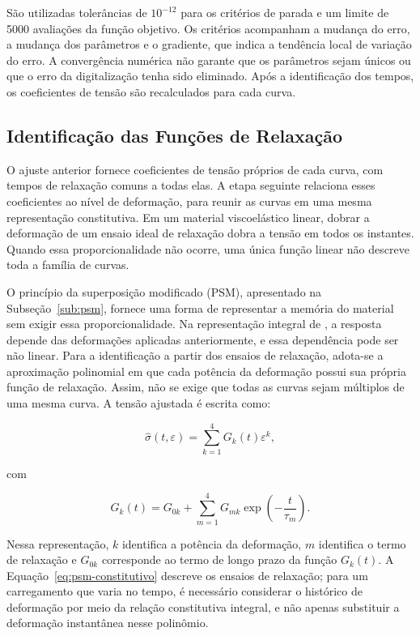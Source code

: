 \documentclass[arial,centeredequations,english,brazilian,oneside,section=TITLE]{ifes8}
\begin{document}
São utilizadas tolerâncias de $10^{-12}$ para os critérios de parada e um limite de
5000 avaliações da função objetivo. Os critérios acompanham a mudança do erro, a mudança
dos parâmetros e o gradiente, que indica a tendência local de variação do erro. A convergência
numérica não garante que os parâmetros sejam únicos ou que o erro da digitalização tenha
sido eliminado. Após a identificação dos tempos, os coeficientes de tensão são recalculados
para cada curva.

\subsection{Identificação das Funções de Relaxação}
\label{sec:identificacao-funcoes-relaxacao}

O ajuste anterior fornece coeficientes de tensão próprios de cada curva,
com tempos de relaxação comuns a todas elas. A etapa seguinte relaciona esses
coeficientes ao nível de deformação, para reunir as curvas em uma mesma
representação constitutiva. Em um material viscoelástico linear, dobrar a deformação de um ensaio ideal de
relaxação dobra a tensão em todos os instantes. Quando essa proporcionalidade não ocorre,
uma única função linear não descreve toda a família de curvas.

O princípio da superposição modificado (PSM), apresentado na
Subseção~\ref{sub:psm}, fornece uma forma de representar a memória
do material sem exigir essa proporcionalidade. Na representação integral de
, a resposta depende das deformações aplicadas anteriormente,
e essa dependência pode ser não linear. Para a identificação a partir dos ensaios de
relaxação, adota-se a aproximação polinomial em que cada potência da deformação possui sua
própria função de relaxação. Assim, não se exige que todas as curvas sejam múltiplos de
uma mesma curva. A tensão ajustada é escrita como:

\begin{equation}
  \label{eq:psm-constitutivo}
  \widehat{\sigma}(t,\varepsilon)
  =\sum_{k=1}^{4}G_k(t)\varepsilon^k,
\end{equation}

com

\begin{equation}
  \label{eq:psm-relaxacao}
  G_k(t)=G_{0k}
  +\sum_{m=1}^{4}G_{mk}\exp\left(-\frac{t}{\tau_m}\right).
\end{equation}

Nessa representação, $k$ identifica a potência da deformação, $m$ identifica o termo de
relaxação e $G_{0k}$ corresponde ao termo de longo prazo da função $G_k(t)$. A
Equação~\eqref{eq:psm-constitutivo} descreve os ensaios de relaxação; para um carregamento
que varia no tempo, é necessário considerar o histórico de deformação por meio da relação
constitutiva integral, e não apenas substituir a deformação instantânea nesse polinômio.
\end{document}
